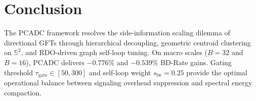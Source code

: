\documentclass[11pt,a4paper]{article}
\begin{document}
\section{Conclusion}
The PCADC framework resolves the side-information scaling dilemma of directional GFTs through hierarchical decoupling, geometric centroid clustering on $\mathbb{S}^2$, and RDO-driven graph self-loop tuning. On macro scales ($B=32$ and $B=16$), PCADC delivers $-0.776\%$ and $-0.539\%$ BD-Rate gains. Gating threshold $\tau_{\text{gate}} \in [50, 300]$ and self-loop weight $s_{\text{lw}} = 0.25$ provide the optimal operational balance between signaling overhead suppression and spectral energy compaction.
\end{document}
